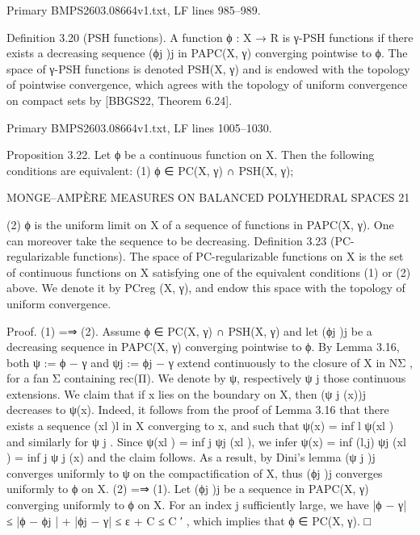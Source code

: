 \documentclass[
  11pt,
]{article}
\newenvironment{Shaded}{}{}
\newcommand{\NormalTok}[1]{#1}
\begin{document}
Primary BMPS2603.08664v1.txt, LF lines 985--989.

\begin{Shaded}
\begin{Highlighting}[]
\NormalTok{Definition 3.20 (PSH functions). A function ϕ : X → R is γ{-}PSH functions if there exists a}
\NormalTok{decreasing sequence (ϕj )j in PAPC(X, γ) converging pointwise to ϕ.}
\NormalTok{   The space of γ{-}PSH functions is denoted PSH(X, γ) and is endowed with the topology of pointwise}
\NormalTok{convergence, which agrees with the topology of uniform convergence on compact sets by [BBGS22,}
\NormalTok{Theorem 6.24].}
\end{Highlighting}
\end{Shaded}

Primary BMPS2603.08664v1.txt, LF lines 1005--1030.

\begin{Shaded}
\begin{Highlighting}[]
\NormalTok{Proposition 3.22. Let ϕ be a continuous function on X. Then the following conditions are}
\NormalTok{equivalent:}
\NormalTok{     (1) ϕ ∈ PC(X, γ) ∩ PSH(X, γ);}

\NormalTok{                  MONGE–AMPÈRE MEASURES ON BALANCED POLYHEDRAL SPACES                             21}


\NormalTok{   (2) ϕ is the uniform limit on X of a sequence of functions in PAPC(X, γ). One can moreover}
\NormalTok{       take the sequence to be decreasing.}
\NormalTok{Definition 3.23 (PC{-}regularizable functions). The space of PC{-}regularizable functions on X}
\NormalTok{is the set of continuous functions on X satisfying one of the equivalent conditions (1) or (2) above.}
\NormalTok{We denote it by PCreg (X, γ), and endow this space with the topology of uniform convergence.}

\NormalTok{Proof. (1) =⇒ (2). Assume ϕ ∈ PC(X, γ) ∩ PSH(X, γ) and let (ϕj )j be a decreasing sequence}
\NormalTok{in PAPC(X, γ) converging pointwise to ϕ. By Lemma 3.16, both ψ := ϕ − γ and ψj := ϕj − γ}
\NormalTok{extend continuously to the closure of X in NΣ , for a fan Σ containing rec(Π). We denote by ψ,}
\NormalTok{respectively ψ j those continuous extensions. We claim that if x lies on the boundary on X, then}
\NormalTok{(ψ j (x))j decreases to ψ(x). Indeed, it follows from the proof of Lemma 3.16 that there exists a}
\NormalTok{sequence (xl )l in X converging to x, and such that ψ(x) = inf l ψ(xl ) and similarly for ψ j . Since}
\NormalTok{ψ(xl ) = inf j ψj (xl ), we infer ψ(x) = inf (l,j) ψj (xl ) = inf j ψ j (x) and the claim follows.}
\NormalTok{As a result, by Dini’s lemma (ψ j )j converges uniformly to ψ on the compactification of X, thus}
\NormalTok{(ϕj )j converges uniformly to ϕ on X.}
\NormalTok{   (2) =⇒ (1). Let (ϕj )j be a sequence in PAPC(X, γ) converging uniformly to ϕ on X. For an}
\NormalTok{index j sufficiently large, we have}
\NormalTok{                            |ϕ − γ| ≤ |ϕ − ϕj | + |ϕj − γ| ≤ ε + C ≤ C ′ ,}
\NormalTok{which implies that ϕ ∈ PC(X, γ).                                                                   □}
\end{Highlighting}
\end{Shaded}
\end{document}
